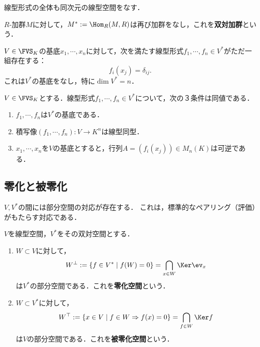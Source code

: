 \documentclass[uplatex, dvipdfmx]{jsreport}
\begin{document}
\begin{tcolorbox}[colframe=ForestGreen, colback=ForestGreen!10!white,breakable,colbacktitle=ForestGreen!40!white,coltitle=black,fonttitle=\bfseries\sffamily,
title=]
    線型形式の全体も同次元の線型空間をなす．
\end{tcolorbox}

\begin{definition}
    $R$-加群$M$に対して，$M^*:=\Hom_R(M,R)$は再び加群をなし，これを\textbf{双対加群}という．
\end{definition}

\begin{proposition}[双対基底の存在]
    $V\in\FVS_K$の基底$x_1,\cdots,x_n$に対して，次を満たす線型形式$f_1,\cdots,f_n\in V^*$がただ一組存在する：
    \[f_i(x_j)=\delta_{ij}.\]
    これは$V^*$の基底をなし，特に$\dim V^*=n$．
\end{proposition}

\begin{proposition}[双対基底の特徴付け]
    $V\in\FVS_K$とする．線型形式$f_1,\cdots,f_n\in V^*$について，次の３条件は同値である．
    \begin{enumerate}
        \item $f_1,\cdots,f_n$は$V^*$の基底である．
        \item 積写像$(f_1,\cdots,f_n):V\to K^n$は線型同型．
        \item $x_1,\cdots,x_n$を$V$の基底とすると，行列$A=(f_i(x_j))\in M_n(K)$は可逆である．
    \end{enumerate}
\end{proposition}

\subsection{零化と被零化}

\begin{tcolorbox}[colframe=ForestGreen, colback=ForestGreen!10!white,breakable,colbacktitle=ForestGreen!40!white,coltitle=black,fonttitle=\bfseries\sffamily,
title=]
    $V,V^*$の間には部分空間の対応が存在する．
    これは，標準的なペアリング（評価）がもたらす対応である．
\end{tcolorbox}

\begin{proposition}
    $V$を線型空間，$V^*$をその双対空間とする．
    \begin{enumerate}
        \item $W\subset V$に対して，
        \[W^\bot:=\{f\in V^*\mid f(W)=0\}=\bigcap_{x\in W}\Ker\ev_x\]
        は$V^*$の部分空間である．これを\textbf{零化空間}という．
        \item $W\subset V^*$に対して，
        \[W^\top:=\{x\in V\mid f\in W\Rightarrow f(x)=0\}=\bigcap_{f\in W}\Ker f\]
        は$V$の部分空間である．これを\textbf{被零化空間}という．
    \end{enumerate}
\end{proposition}
\end{document}
